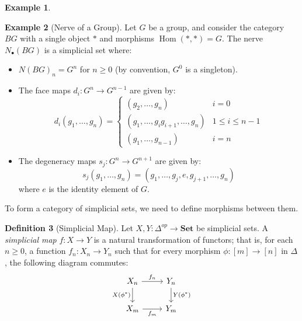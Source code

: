 \documentclass[11pt]{article}
\theoremstyle{definition}
\newtheorem{definition}{Definition}[section]
\newtheorem{example}[definition]{Example}
\theoremstyle{plain}
\begin{document}
\begin{example}
\begin{itemize}
    \end{itemize}

\end{example}


\begin{example}[Nerve of a Group]
    Let $G$ be a group, and consider the category $BG$ with a single object $\ast$ and morphisms $\operatorname{Hom}(\ast, \ast) = G$. The nerve $N_\bullet(BG)$ is a simplicial set where:
    \begin{itemize}
        \item $N(BG)_n = G^n$ for $n \geq 0$ (by convention, $G^0$ is a singleton).
        \item The face maps $d_i : G^n \to G^{n-1}$ are given by:
              \[
                  d_i(g_1, \ldots, g_n) =
                  \begin{cases}
                      (g_2, \ldots, g_n)                      & i = 0             \\
                      (g_1, \ldots, g_i g_{i+1}, \ldots, g_n) & 1 \leq i \leq n-1 \\
                      (g_1, \ldots, g_{n-1})                  & i = n
                  \end{cases}
              \]
        \item The degeneracy maps $s_j : G^n \to G^{n+1}$ are given by:
              \[
                  s_j(g_1, \ldots, g_n) = (g_1, \ldots, g_j, e, g_{j+1}, \ldots, g_n)
              \]
              where $e$ is the identity element of $G$.
    \end{itemize}
\end{example}


To form a category of simplicial sets, we need to define morphisms between them.


\begin{definition}[Simplicial Map]
    Let $X, Y : \Delta^{op} \to \mathbf{Set}$ be simplicial sets. A \emph{simplicial map} $f : X \to Y$ is a natural transformation of functors; that is, for each $n \geq 0$, a function $f_n : X_n \to Y_n$ such that for every morphism $\phi : [m] \to [n]$ in $\Delta$, the following diagram commutes:
    \[
        \begin{tikzcd}
            X_n \arrow[r,"f_n"] \arrow[d,"X(\phi^*)"'] & Y_n \arrow[d,"Y(\phi^*)"] \\
            X_m \arrow[r,"f_m"'] & Y_m
        \end{tikzcd}
    \]

\end{definition}
\end{document}
